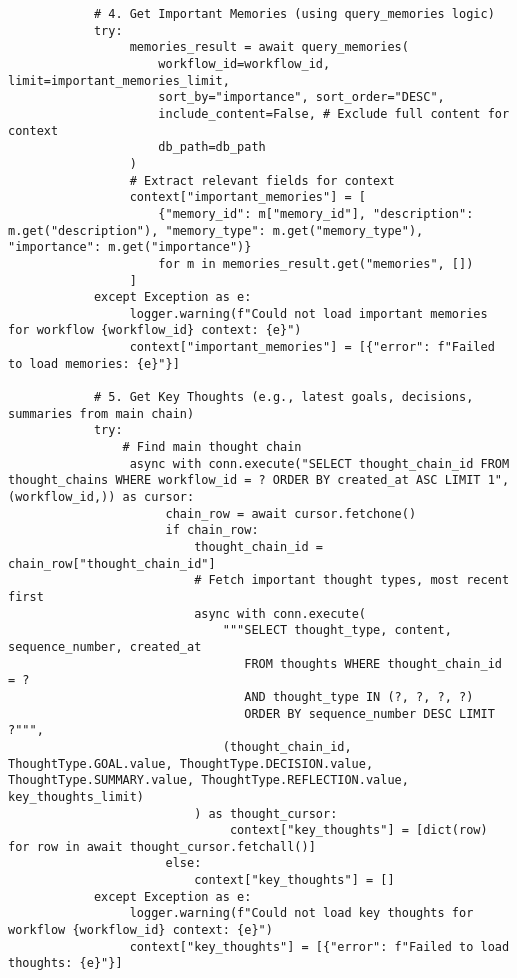 \documentclass[12pt,a4paper]{article}
\begin{document}
\begin{pageablecode}
\begin{verbatim}
            # 4. Get Important Memories (using query_memories logic)
            try:
                 memories_result = await query_memories(
                     workflow_id=workflow_id, limit=important_memories_limit,
                     sort_by="importance", sort_order="DESC",
                     include_content=False, # Exclude full content for context
                     db_path=db_path
                 )
                 # Extract relevant fields for context
                 context["important_memories"] = [
                     {"memory_id": m["memory_id"], "description": m.get("description"), "memory_type": m.get("memory_type"), "importance": m.get("importance")}
                     for m in memories_result.get("memories", [])
                 ]
            except Exception as e:
                 logger.warning(f"Could not load important memories for workflow {workflow_id} context: {e}")
                 context["important_memories"] = [{"error": f"Failed to load memories: {e}"}]

            # 5. Get Key Thoughts (e.g., latest goals, decisions, summaries from main chain)
            try:
                # Find main thought chain
                 async with conn.execute("SELECT thought_chain_id FROM thought_chains WHERE workflow_id = ? ORDER BY created_at ASC LIMIT 1", (workflow_id,)) as cursor:
                      chain_row = await cursor.fetchone()
                      if chain_row:
                          thought_chain_id = chain_row["thought_chain_id"]
                          # Fetch important thought types, most recent first
                          async with conn.execute(
                              """SELECT thought_type, content, sequence_number, created_at
                                 FROM thoughts WHERE thought_chain_id = ?
                                 AND thought_type IN (?, ?, ?, ?)
                                 ORDER BY sequence_number DESC LIMIT ?""",
                              (thought_chain_id, ThoughtType.GOAL.value, ThoughtType.DECISION.value, ThoughtType.SUMMARY.value, ThoughtType.REFLECTION.value, key_thoughts_limit)
                          ) as thought_cursor:
                               context["key_thoughts"] = [dict(row) for row in await thought_cursor.fetchall()]
                      else:
                          context["key_thoughts"] = []
            except Exception as e:
                 logger.warning(f"Could not load key thoughts for workflow {workflow_id} context: {e}")
                 context["key_thoughts"] = [{"error": f"Failed to load thoughts: {e}"}]



\end{verbatim}
\end{pageablecode}
\end{document}
